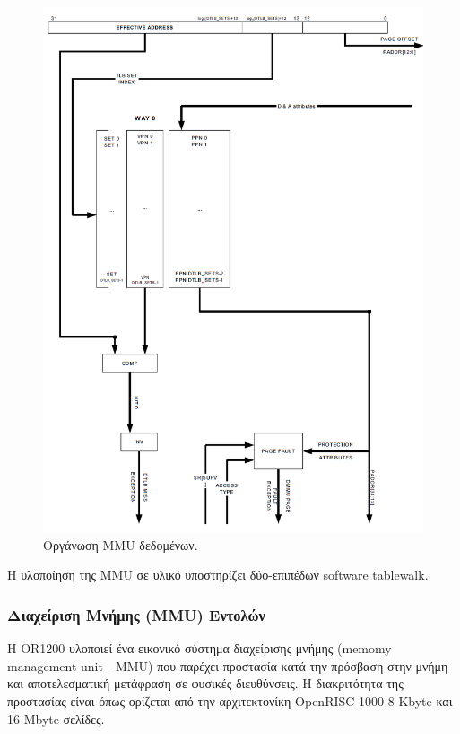 \documentclass[a4paper,10pt]{article}
\numberwithin{figure}{subsection}
\numberwithin{table}{subsection}
\begin{document}
{\newpage
\vspace{0.7cm}
\begin{figure}[h!]
 \centering
 \includegraphics[bb=0 0 891 1229,scale=0.38]{./Images/data_MMU.png}
 \caption{Οργάνωση MMU δεδομένων.}
\end{figure}
\vspace{0.7cm}

Η υλοποίηση της MMU σε υλικό υποστηρίζει δύο-επιπέδων software tablewalk.

\subsubsection{Διαχείριση Μνήμης (MMU) Εντολών}

Η OR1200 υλοποιεί ένα εικονικό σύστημα διαχείρισης μνήμης (memomy management unit - MMU) 
που παρέχει προστασία κατά την πρόσβαση στην μνήμη και αποτελεσματική μετάφραση σε φυσικές
 διευθύνσεις. Η διακριτότητα της προστασίας είναι όπως ορίζεται από την αρχιτεκτονίκη 
OpenRISC 1000 8-Kbyte και 16-Mbyte σελίδες.

}
\end{document}
